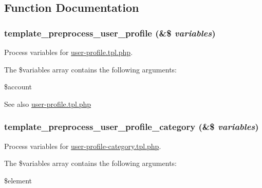 \subsection{Function Documentation}
\hypertarget{user_8pages_8inc_a5a1229a0cb26128b7efab80c025e2d75}{
\subsubsection[{template\_\-preprocess\_\-user\_\-profile}]{\setlength{\rightskip}{0pt plus 5cm}template\_\-preprocess\_\-user\_\-profile (\&\$ {\em variables})}}
\label{user_8pages_8inc_a5a1229a0cb26128b7efab80c025e2d75}
Process variables for \hyperlink{user-profile_8tpl_8php}{user-\/profile.tpl.php}.

The \$variables array contains the following arguments:
\begin{DoxyItemize}
\item \$account
\end{DoxyItemize}

\begin{DoxySeeAlso}{See also}
\hyperlink{user-profile_8tpl_8php}{user-\/profile.tpl.php} 
\end{DoxySeeAlso}
\hypertarget{user_8pages_8inc_a0b8961894318ad623017b48569515d4a}{
\subsubsection[{template\_\-preprocess\_\-user\_\-profile\_\-category}]{\setlength{\rightskip}{0pt plus 5cm}template\_\-preprocess\_\-user\_\-profile\_\-category (\&\$ {\em variables})}}
\label{user_8pages_8inc_a0b8961894318ad623017b48569515d4a}
Process variables for \hyperlink{user-profile-category_8tpl_8php}{user-\/profile-\/category.tpl.php}.

The \$variables array contains the following arguments:
\begin{DoxyItemize}
\item \$element
\end{DoxyItemize}

